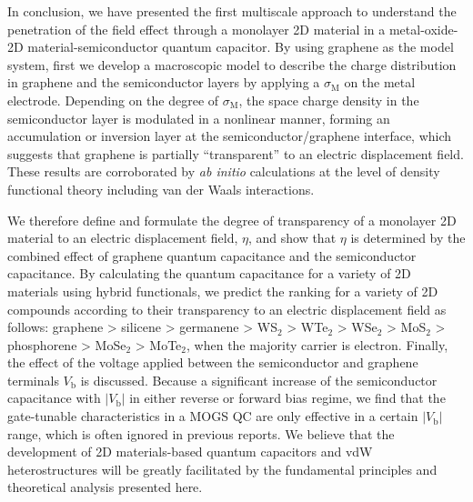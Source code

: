 \documentclass[journal=nalefd]{achemso}
\newcommand*\subs[1]{_{\text{#1}}} %
\newcommand*\change[1]{{#1}}
\begin{document}
In conclusion, we have presented the first multiscale approach to understand the penetration of the field effect through a monolayer 2D material in a metal-oxide-2D material-semiconductor quantum capacitor. 
By using graphene as the model system, first we develop a macroscopic model to describe the charge distribution in graphene and the semiconductor layers by applying a $\sigma\subs{M}$ on the metal electrode. 
Depending on the degree of $\sigma\subs{M}$, the space charge density in the semiconductor layer is modulated in a nonlinear manner, forming an accumulation or inversion layer at the semiconductor/graphene interface, which suggests that graphene is partially ``transparent'' to an electric displacement field. These results are corroborated by {\it ab initio} calculations at the level of density functional theory including van der Waals 
interactions. 

We therefore define and formulate the degree of transparency of a monolayer 
2D material to an electric displacement field, $\eta$, and show that $\eta$ is determined 
by the combined effect of graphene quantum capacitance and the semiconductor capacitance.
By calculating the quantum capacitance for a variety of 2D materials using hybrid functionals, we predict 
the ranking for a variety of 2D compounds according to their transparency to an 
electric displacement field 
as follows: 
\change{
graphene > silicene > germanene > WS$\subs{2}$ > WTe$\subs{2}$ > WSe$\subs{2}$ > MoS$\subs{2}$ > phosphorene > MoSe$\subs{2}$ > MoTe$\subs{2}$,
} when the majority carrier is electron. 
Finally, the effect of the voltage applied between the semiconductor and graphene terminals $V\subs{b}$ is discussed. 
Because a significant increase of the semiconductor capacitance with $|V\subs{b}|$ in either 
reverse or forward bias regime, we find that the 
gate-tunable characteristics in a MOGS QC are only effective in a certain $|V\subs{b}|$ range, 
which is often ignored in previous reports. 
We believe that the development of 2D materials-based quantum capacitors and 
vdW heterostructures will be greatly facilitated by the fundamental 
principles and theoretical analysis presented here.
\end{document}
